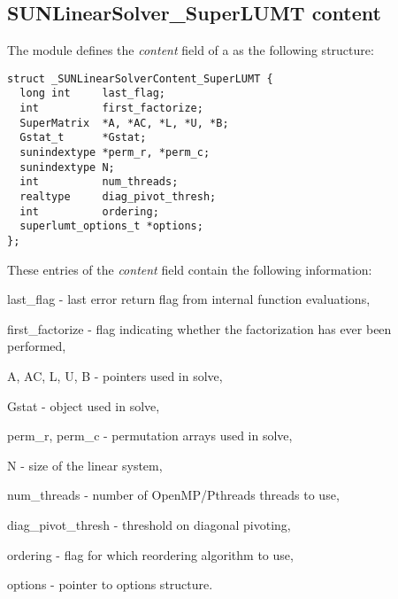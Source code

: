 \subsection{SUNLinearSolver\_SuperLUMT content}
\label{ss:sunlinsol_slumt_content}

The {\sunlinsolslumt} module defines the \textit{content} field of a
 as the following structure:
\begin{verbatim} 
struct _SUNLinearSolverContent_SuperLUMT {
  long int     last_flag;
  int          first_factorize;
  SuperMatrix  *A, *AC, *L, *U, *B;
  Gstat_t      *Gstat;
  sunindextype *perm_r, *perm_c;
  sunindextype N;
  int          num_threads;
  realtype     diag_pivot_thresh; 
  int          ordering;
  superlumt_options_t *options;
};
\end{verbatim}
These entries of the \emph{content} field contain the following
information:
\begin{args}
  \item[last\_flag] - last error return flag from internal function evaluations,
  \item[first\_factorize] - flag indicating whether the factorization
    has ever been performed, 
  \item[A, AC, L, U, B] -  pointers used in solve,
  \item[Gstat] -  object used in solve,
  \item[perm\_r, perm\_c] - permutation arrays used in solve,
  \item[N] - size of the linear system,
  \item[num\_threads] - number of OpenMP/Pthreads threads to use,
  \item[diag\_pivot\_thresh] - threshold on diagonal pivoting,
  \item[ordering] - flag for which reordering algorithm to use,
  \item[options] - pointer to {\superlumt} options structure.
\end{args}

